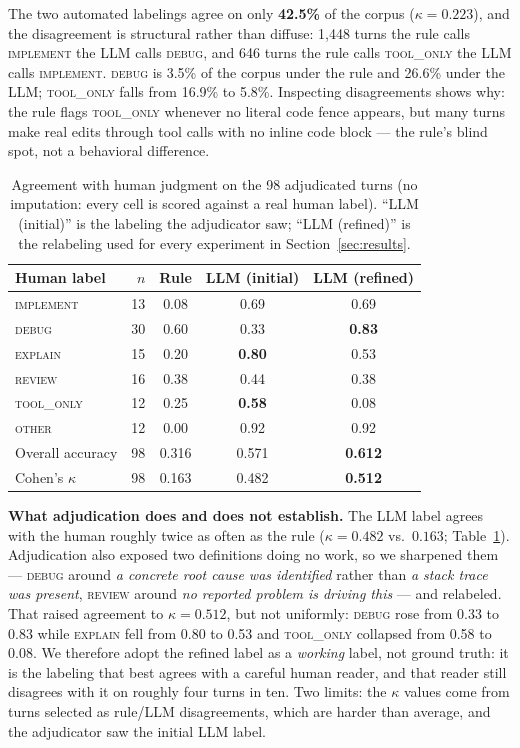 \documentclass{article}
\begin{document}
The two automated labelings agree on only \textbf{42.5\%} of the corpus
($\kappa = 0.223$), and the disagreement is structural rather than diffuse:
1,448 turns the rule calls \textsc{implement} the LLM calls \textsc{debug}, and
646 turns the rule calls \textsc{tool\_only} the LLM calls \textsc{implement}.
\textsc{debug} is 3.5\% of the corpus under the rule and 26.6\% under the LLM;
\textsc{tool\_only} falls from 16.9\% to 5.8\%. Inspecting disagreements shows
why: the rule flags \textsc{tool\_only} whenever no literal code fence appears,
but many turns make real edits through tool calls with no inline code block ---
the rule's blind spot, not a behavioral difference.

\begin{table}[t]
\caption{Agreement with human judgment on the 98 adjudicated turns (no
imputation: every cell is scored against a real human label). ``LLM (initial)''
is the labeling the adjudicator saw; ``LLM (refined)'' is the relabeling used
for every experiment in Section~\ref{sec:results}.}
\label{tab:agreement}
\centering
\small
\begin{tabular}{lrccc}
\toprule
Human label & $n$ & Rule & LLM (initial) & LLM (refined) \\
\midrule
\textsc{implement} & 13 & 0.08 & 0.69 & 0.69 \\
\textsc{debug}     & 30 & 0.60 & 0.33 & \textbf{0.83} \\
\textsc{explain}   & 15 & 0.20 & \textbf{0.80} & 0.53 \\
\textsc{review}    & 16 & 0.38 & 0.44 & 0.38 \\
\textsc{tool\_only}& 12 & 0.25 & \textbf{0.58} & 0.08 \\
\textsc{other}     & 12 & 0.00 & 0.92 & 0.92 \\
\midrule
Overall accuracy & 98 & 0.316 & 0.571 & \textbf{0.612} \\
Cohen's $\kappa$ & 98 & 0.163 & 0.482 & \textbf{0.512} \\
\bottomrule
\end{tabular}
\end{table}

\textbf{What adjudication does and does not establish.} The LLM label agrees
with the human roughly twice as often as the rule ($\kappa = 0.482$ vs.\
$0.163$; Table~\ref{tab:agreement}). Adjudication also exposed two definitions
doing no work, so we sharpened them --- \textsc{debug} around \emph{a concrete
root cause was identified} rather than \emph{a stack trace was present},
\textsc{review} around \emph{no reported problem is driving this} --- and
relabeled. That raised agreement to $\kappa = 0.512$, but not uniformly:
\textsc{debug} rose from 0.33 to 0.83 while \textsc{explain} fell from 0.80 to
0.53 and \textsc{tool\_only} collapsed from 0.58 to 0.08. We therefore adopt the
refined label as a \emph{working} label, not ground truth: it is the labeling
that best agrees with a careful human reader, and that reader still disagrees
with it on roughly four turns in ten. Two limits: the $\kappa$ values come from
turns selected as rule/LLM disagreements, which are harder than average, and the
adjudicator saw the initial LLM label.
\end{document}
